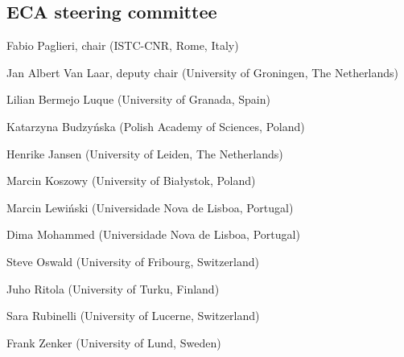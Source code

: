  	\subsection*{ECA steering committee}
 	\begin{compactitem}[]
	\item[] Fabio Paglieri, chair (ISTC-CNR, Rome, Italy)
	\item[] Jan Albert Van Laar, deputy chair (University of Groningen, The Netherlands)
	\item[] Lilian Bermejo Luque (University of Granada, Spain)
	\item[] Katarzyna Budzyńska (Polish Academy of Sciences, Poland)
	\item[] Henrike Jansen (University of Leiden, The Netherlands)
	\item[] Marcin Koszowy (University of Białystok, Poland)
	\item[] Marcin Lewiński (Universidade Nova de Lisboa, Portugal)
	\item[] Dima Mohammed (Universidade Nova de Lisboa, Portugal)
	\item[] Steve Oswald (University of Fribourg, Switzerland)
	\item[] Juho Ritola (University of Turku, Finland)
	\item[]Sara Rubinelli (University of Lucerne, Switzerland)
	\item[] Frank Zenker (University of Lund, Sweden)
	\end{compactitem}


